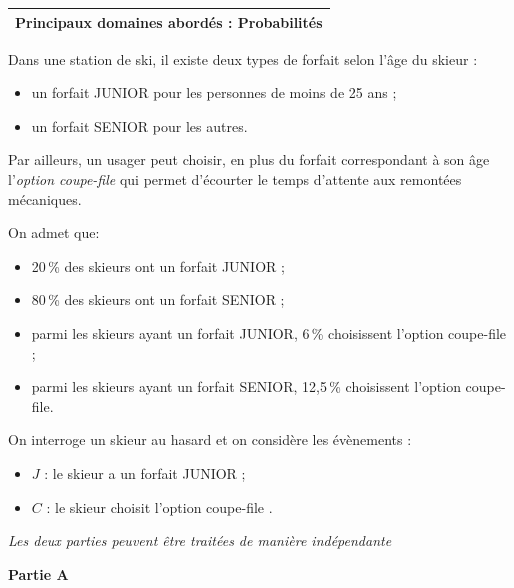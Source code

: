 \medskip

\begin{tabularx}{\linewidth}{|X|}\hline
\textbf{Principaux domaines abordés :} Probabilités\\ \hline
\end{tabularx}

\medskip

Dans une station de ski, il existe deux types de forfait selon l'âge du skieur :

\begin{itemize}
\item un forfait JUNIOR pour les personnes de moins de 25 ans ;
\item un forfait SENIOR pour les autres.
\end{itemize}

 Par ailleurs, un usager peut choisir, en plus du forfait correspondant à son âge l'\emph{option coupe-file} qui permet d'écourter le temps d'attente aux remontées mécaniques.

On admet que:
\begin{itemize}
\item[$\bullet~~$] 20\,\% des skieurs ont un forfait JUNIOR ;
\item[$\bullet~~$] 80\,\% des skieurs ont un forfait SENIOR ;
\item[$\bullet~~$] parmi les skieurs ayant un forfait JUNIOR, 6\,\% choisissent l'option coupe-file ;
\item[$\bullet~~$] parmi les skieurs ayant un forfait SENIOR, 12,5\,\% choisissent l'option coupe-file.
\end{itemize}

On interroge un skieur au hasard et on considère les évènements :

\begin{itemize}
\item[$\bullet~~$] $J$ : \og le skieur a un forfait JUNIOR \fg ;
\item[$\bullet~~$] $C$ : \og le skieur choisit l'option coupe-file \fg.
\end{itemize}

\medskip

\emph{Les deux parties peuvent être traitées de manière indépendante}

\bigskip

\textbf{Partie A}

\medskip

